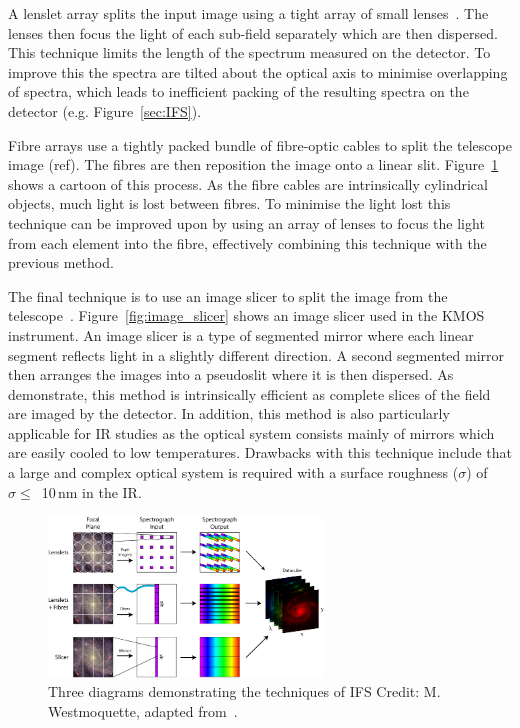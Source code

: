 A lenslet array splits the input image using a tight array of small lenses~\citep{1995A&AS..113..347B}.
The lenses then focus the light of each sub-field separately which are then dispersed.
This technique limits the length of the spectrum measured on the detector.
To improve this the spectra are tilted about the optical axis to minimise overlapping of spectra, which leads to inefficient packing of the resulting spectra on the detector (e.g. Figure~\ref{sec:IFS}).

Fibre arrays use a tightly packed bundle of fibre-optic cables to split the telescope image (ref).
The fibres are then reposition the image onto a linear slit.
Figure~\ref{fig:IFS} shows a cartoon of this process.
As the fibre cables are intrinsically cylindrical objects, much light is lost between fibres.
To minimise the light lost this technique can be improved upon by using an array of lenses to focus the light from each element into the fibre, effectively combining this technique with the previous method.

The final technique is to use an image slicer to split the image from the telescope~\citep{1997SPIE.2871.1295C}.
Figure~\ref{fig:image_slicer} shows an image slicer used in the KMOS instrument.
An image slicer is a type of segmented mirror where each linear segment reflects light in a slightly different direction.
A second segmented mirror then arranges the images into a pseudoslit where it is then dispersed.
As~\cite{2006NewAR..50..244A} demonstrate, this method is intrinsically efficient as complete slices of the field are imaged by the detector.
In addition, this method is also particularly applicable for IR studies as the optical system consists mainly of mirrors which are easily cooled to low temperatures.
Drawbacks with this technique include that a large and complex optical system is required with a surface roughness ($\sigma$) of $\sigma \leq$~10\,nm in the IR.


\begin{figure}
 \centering
 \includegraphics[width=0.65\textwidth]{kmos/ifu_designs}
 \caption[Integral Field Spectrosopic methods]{Three diagrams demonstrating the techniques of IFS
 Credit: M. Westmoquette, adapted from~\citep{2006NewAR..50..244A}.
 \label{fig:IFS}}
\end{figure}

